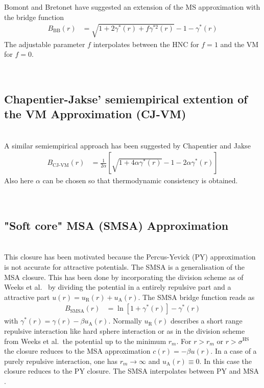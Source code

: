 Bomont and Bretonet \cite{Bomont2003,Bomont2004} have suggested an
extension of the MS approximation with the bridge function
\begin{align}
B_\text{BB}(r) &=
\sqrt{1+2\gamma^*(r)+f\gamma^{*2}(r)}-1-\gamma^*(r)
\end{align}
The adjustable parameter $f$ interpolates between the HNC for $f=1$ and the
VM for $f=0$.

\vphantom{.}~\\
\subsection{Chapentier-Jakse' semiempirical extention of the VM Approximation (CJ-VM)}
~\\

A similar semiempirical approach has been suggested by Chapentier and Jakse
\cite{Charpentier2001}
\begin{align}
B_\text{CJ-VM}(r) &= \frac{1}{2\alpha}\left[\sqrt{1+4\alpha
\gamma^*(r)}-1-2\alpha\gamma^*(r) \right]
\end{align}
Also here $\alpha$ can be chosen so that thermodynamic consistency is obtained.


~\\
\subsection{"Soft core" MSA (SMSA) Approximation}
~\\

This closure has been motivated because the Percus-Yevick (PY) approximation is not accurate for attractive
potentials. The SMSA \cite{Madden1980,Chihara1973} is a generalisation of the MSA closure. This has been
done by incorporating the division scheme as of Weeks et al.\ \cite{Weeks1971} by dividing the potential
in a entirely repulsive part and a attractive part $u(r) = u_\text{R}(r)+u_\text{A}(r)$. The SMSA bridge function reads as
\begin{align}
B_\text{SMSA}(r) &= \ln \left[1+\gamma^*(r)\right]-\gamma^*(r)
\end{align}
with $\gamma^*(r)=\gamma(r)-\beta u_\text{A}(r)$.
Normally  $u_\text{R}(r)$ describes a short range repulsive interaction like hard sphere interaction or as in the
division scheme from Weeks et al.\ the potential up to the minimum $r_m$. For $r>r_m$ or $r > \sigma^\text{HS}$ the
closure reduces to the MSA approximation $c(r)=-\beta u(r)$. In a case of a purely repulsive interaction, one has
$r_m\rightarrow \infty$ and $u_\text{A}(r) \equiv 0$. In this case the closure reduces to the PY closure.
The SMSA interpolates between PY and MSA \cite{Bomont2008}.

